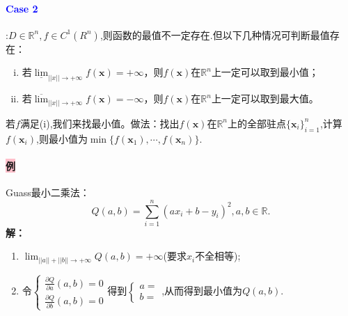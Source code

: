 \documentclass[UTF8]{ctexart}
\newcommand{\p}[2]{\frac{\partial #1}{\partial #2}}
\newcommand{\x}{\boldsymbol{x}}
\begin{document}
    \vspace{2ex}
    \paragraph{\textcolor{blue}{Case 2}}:$D\in \mathbb{R}^n,f\in C^1(R^n)$,则函数的最值不一定存在.但以下几种情况可判断最值存在：
    \begin{enumerate}[(i)]
        \item 若$\underline{\lim}_{||x||\to+\infty}f(\x)=+\infty$，则$f(\x)$在$\mathbb{R}^n$上一定可以取到最小值；
        \item 若$\overline{\lim}_{||x||\to+\infty}f(\x)=-\infty$，则$f(\x)$在$\mathbb{R}^n$上一定可以取到最大值。
    \end{enumerate}
    若$f$满足(i),我们来找最小值。做法：找出$f(\x)$在$\mathbb{R}^n$上的全部驻点$\{\x_i\}_{i=1}^n$,计算$f(\x_i)$,则最小值为$\min\{f(\x_1),\cdots,f(\x_n)\}$.

    \paragraph{\colorbox{pink}{例}}Guass最小二乘法：
    $$Q(a,b)=\sum_{i=1}^n(ax_i+b-y_i)^2,a,b\in\mathbb{R}.$$
    \textbf{解：}
    \begin{enumerate}[{Step} 1{:}]
        \item $\lim_{||a||+||b||\to+\infty}Q(a,b)=+\infty$(要求$x_i$不全相等);
        \item 令$\begin{cases}
            \p{Q}{a}(a,b)=0\\
            \p{Q}{b}(a,b)=0
        \end{cases}$得到$\begin{cases}
            a=\\
            b=
        \end{cases}$,从而得到最小值为$Q(a,b)$.
    \end{enumerate}
\end{document}
